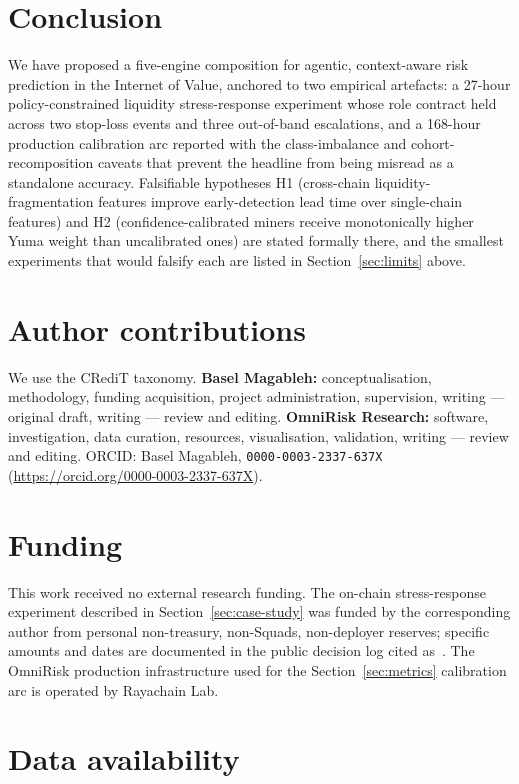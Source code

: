 \documentclass[11pt,a4paper]{article}
\begin{document}
\section{Conclusion}\label{sec:conclusion}

We have proposed a five-engine composition for agentic, context-aware
risk prediction in the Internet of Value, anchored to two empirical
artefacts: a 27-hour policy-constrained liquidity stress-response
experiment whose role contract held across two stop-loss events and
three out-of-band escalations, and a 168-hour production calibration arc
reported with the class-imbalance and cohort-recomposition caveats that
prevent the headline from being misread as a standalone accuracy.
Falsifiable hypotheses H1
(cross-chain liquidity-fragmentation features improve early-detection
lead time over single-chain features) and H2
(confidence-calibrated miners receive monotonically higher Yuma weight
than uncalibrated ones) are stated formally there, and the smallest
experiments that would falsify each are listed in
Section~\ref{sec:limits} above.

\section*{Author contributions}

We use the CRediT taxonomy. \textbf{Basel Magableh:} conceptualisation,
methodology, funding acquisition, project administration, supervision,
writing --- original draft, writing --- review and editing.
\textbf{OmniRisk Research:} software, investigation, data curation,
resources, visualisation, validation, writing --- review and editing.
ORCID: Basel Magableh, \texttt{0000-0003-2337-637X}
(\url{https://orcid.org/0000-0003-2337-637X}).

\section*{Funding}

This work received no external research funding. The on-chain
stress-response experiment described in Section~\ref{sec:case-study}
was funded by the corresponding author from personal non-treasury,
non-Squads, non-deployer reserves; specific amounts and dates are
documented in the public decision log cited
as~\cite{omnirisk2026defending}. The OmniRisk production infrastructure
used for the Section~\ref{sec:metrics} calibration arc is operated by
Rayachain Lab.

\section*{Data availability}
\end{document}
